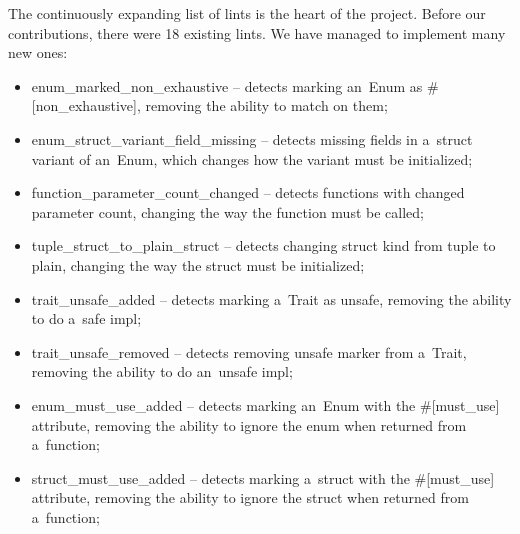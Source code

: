 \documentclass[licencjacka,en]{pracamgr}
\begin{document}
The continuously expanding list of lints is the heart of the project.
Before our contributions, there were 18 existing lints.
We have managed to implement many new ones:
\begin{itemize}
    \item {\ttfamily enum\_marked\_non\_exhaustive}
        -- detects marking an~{\ttfamily Enum} as {\ttfamily \#[non\_exhaustive]}, removing the ability to match on them;
    \item {\ttfamily enum\_struct\_variant\_field\_missing}
        -- detects missing fields in a~struct variant of an~{\ttfamily Enum},
        which changes how the variant must be initialized;
    \item {\ttfamily function\_parameter\_count\_changed}
        -- detects functions with changed parameter count,
        changing the way the function must be called;
    \item {\ttfamily tuple\_struct\_to\_plain\_struct}
        -- detects changing struct kind from tuple to plain,
        changing the way the struct must be initialized;
    \item {\ttfamily trait\_unsafe\_added}
        -- detects marking a~{\ttfamily Trait} as {\ttfamily unsafe},
        removing the ability to do a~safe {\ttfamily impl};
    \item {\ttfamily trait\_unsafe\_removed}
        -- detects removing {\ttfamily unsafe} marker from a~{\ttfamily Trait},
        removing the ability to do an~unsafe {\ttfamily impl};
    \item {\ttfamily enum\_must\_use\_added}
        -- detects marking an~{\ttfamily Enum} with the {\ttfamily \#[must\_use]} attribute,
        removing the ability to ignore the enum when returned from a~function;
    \item {\ttfamily struct\_must\_use\_added}
        -- detects marking a~struct with the {\ttfamily \#[must\_use]} attribute,
        removing the ability to ignore the struct when returned from a~function;

\end{itemize}
\end{document}
